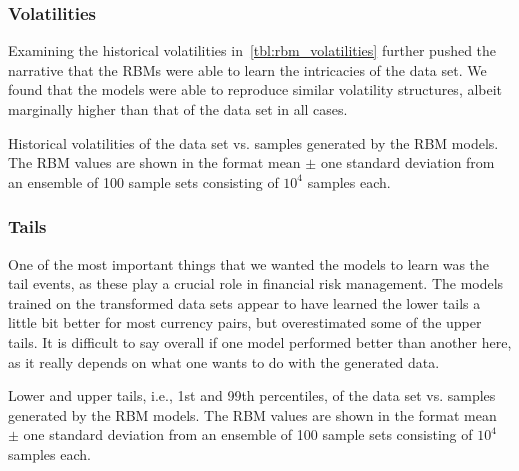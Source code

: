 \subsubsection{Volatilities}
Examining the historical volatilities in~\cref{tbl:rbm_volatilities} further pushed the narrative that the RBMs were able to learn the intricacies of the data set.
We found that the models were able to reproduce similar volatility structures, albeit marginally higher than that of the data set in all cases.
\begin{table}[!htb]
    \centering
    \begin{adjustbox}{max width=\textwidth}
        
    \end{adjustbox}
    \caption{Historical volatilities of the data set vs. samples generated by the RBM models. The RBM values are shown in the format mean \(\pm\) one standard deviation from an ensemble of 100 sample sets consisting of \( 10^4 \) samples each.}
    \label{tbl:rbm_volatilities}
\end{table}

\subsubsection{Tails}
One of the most important things that we wanted the models to learn was the tail events, as these play a crucial role in financial risk management.
The models trained on the transformed data sets appear to have learned the lower tails a little bit better for most currency pairs, but overestimated some of the upper tails.
It is difficult to say overall if one model performed better than another here, as it really depends on what one wants to do with the generated data.
\begin{table}[!htb]
    \centering
    \begin{adjustbox}{max width=\textwidth}
        
    \end{adjustbox}
    \caption{Lower and upper tails, i.e., 1st and 99th percentiles, of the data set vs. samples generated by the RBM models. The RBM values are shown in the format mean \(\pm\) one standard deviation from an ensemble of 100 sample sets consisting of \( 10^4 \) samples each.}
    \label{tbl:rbm_tails}
\end{table}

